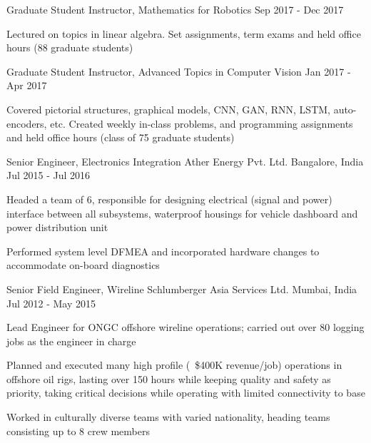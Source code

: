 \begin{cventries}
  \cventry
	{Graduate Student Instructor, Mathematics for Robotics} %
	{} %
	{} %
	{Sep 2017 - Dec 2017} %
	{
		\begin{cvitems} %
			\item {Lectured on topics in linear algebra. Set assignments, term exams and held office hours (88 graduate students)}
		\end{cvitems}
	}
  \cventry
	{Graduate Student Instructor, Advanced Topics in Computer Vision} %
	{} %
	{} %
	{Jan 2017 - Apr	 2017} %
	{
		\begin{cvitems} %
			\item {Covered pictorial structures, graphical models, CNN, GAN, RNN, LSTM, auto-encoders, etc. Created weekly in-class problems, and programming assignments and held office hours (class of 75 graduate students)}
		\end{cvitems}
	}      
\vspace{0.4cm}
  \cventry
    {Senior Engineer, Electronics Integration} %
    {Ather Energy Pvt. Ltd.} %
    {Bangalore, India} %
    {Jul 2015 - Jul 2016} %
    {
      \begin{cvitems} %
        \item{Headed a team of 6, responsible for designing electrical (signal and power) interface between all subsystems, waterproof housings for vehicle dashboard and power distribution unit}
        \item {Performed system level DFMEA and incorporated hardware changes to accommodate on-board diagnostics}
      \end{cvitems}
    }

  \cventry
	{Senior Field Engineer, Wireline} %
	{Schlumberger Asia Services Ltd.} %
	{Mumbai, India} %
	{Jul 2012 - May 2015} %
	{
		\begin{cvitems} %
			\item{Lead Engineer for ONGC offshore wireline operations; carried out over 80 logging jobs as the engineer in charge}
			\item {Planned and executed many high profile (~\$400K revenue/job) operations in offshore oil rigs, lasting over 150 hours while keeping quality and safety as priority, taking critical decisions while operating with limited connectivity to base}
			\item {Worked in culturally diverse teams with varied nationality, heading teams consisting up to 8 crew members}
		\end{cvitems}
	}

\end{cventries}
